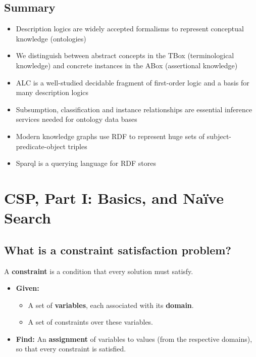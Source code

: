 \documentclass[conference, a4paper]{styles/acmsiggraph}
\begin{document}
    \subsection{Summary}
        \begin{itemize}
            \item Description logics are widely accepted formalisms to represent conceptual knowledge (ontologies)
            \item We distinguish between abstract concepts in the TBox (terminological knowledge) and concrete instances in the ABox (assertional knowledge)
            \item ALC is a well-studied decidable fragment of first-order logic and a basis for many description logics
            \item Subsumption, classification and instance relationships are essential inference services needed for ontology data bases
            \item Modern knowledge graphs use RDF to represent huge sets of subject-predicate-object triples
            \item Sparql is a querying language for RDF stores
        \end{itemize}

\newpage

\section{CSP, Part I: Basics, and Na{\"i}ve Search}

    \subsection{What is a constraint satisfaction problem?}
        A \textbf{constraint} is a condition that every solution must satisfy.
        \begin{itemize}
            \item \textbf{Given:}
                \begin{itemize}
                    \item A set of \textbf{variables}, each associated with its \textbf{domain}.
                    \item A set of constraints over these variables.
                \end{itemize}
            \item \textbf{Find:} An \textbf{assignment} of variables to values (from the respective domains), so that every constraint is satisfied.
        \end{itemize}
    
\end{document}
